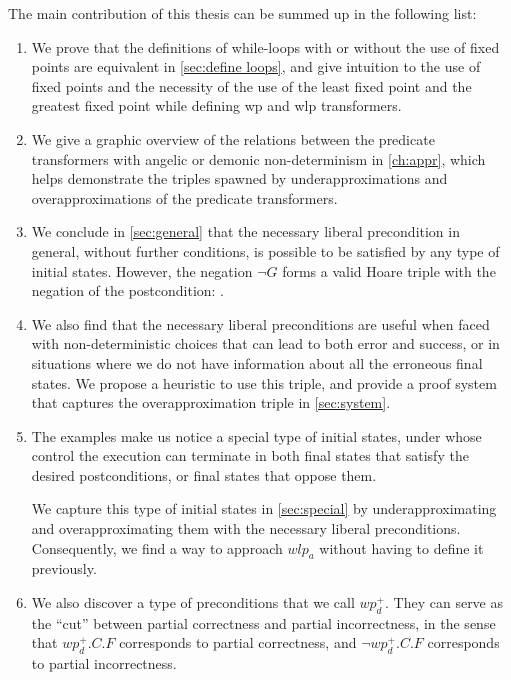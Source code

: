 The main contribution of this thesis can be summed up in the following list: 
\begin{enumerate}
    \item We prove that the definitions of while-loops with or without the use of fixed points are equivalent in \autoref{sec:define loops}, and give intuition to the use of fixed points and the necessity of the use of the least fixed point and the greatest fixed point while defining wp and wlp transformers. 
    \item We give a graphic overview of the relations between the predicate transformers with angelic or demonic non-determinism in \autoref{ch:appr}, which helps demonstrate the triples spawned by underapproximations and overapproximations of the predicate transformers. 
    \item We conclude in \autoref{sec:general} that the necessary liberal precondition in general, without further conditions, is possible to be satisfied by any type of initial states. However, the negation $\neg G$ forms a valid Hoare triple with the negation of the postcondition: . 
    \item We also find that the necessary liberal preconditions are useful when faced with non-deterministic choices that can lead to both error and success, or in situations where we do not have information about all the erroneous final states. We propose a heuristic to use this triple, and provide a proof system that captures the overapproximation triple in \autoref{sec:system}. 
    \item The examples make us notice a special type of initial states, under whose control the execution can terminate in both final states that satisfy the desired postconditions, or final states that oppose them. 
    
    We capture this type of initial states in \autoref{sec:special} by underapproximating and overapproximating them with the necessary liberal preconditions. Consequently, we find a way to approach $wlp_a$ without having to define it previously. 
    \item We also discover a type of preconditions that we call $wp_d^+$. They can serve as the ``cut'' between partial correctness and partial incorrectness, in the sense that $wp_d^+.C.F$ corresponds to partial correctness, and $\neg wp_d^+.C.F$ corresponds to partial incorrectness. 
\end{enumerate}


